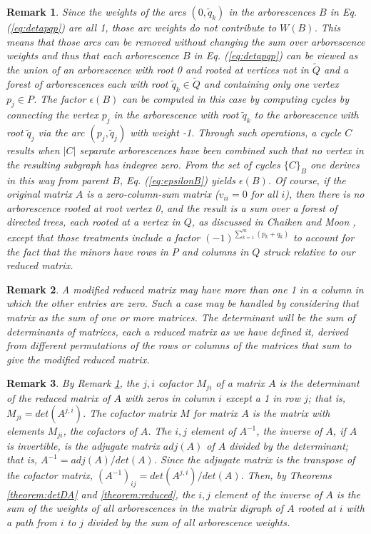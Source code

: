 \documentclass{article}
\newtheorem{remark}{Remark}
\begin{document}
\begin{remark}
Since the weights of the arcs $(0, \tilde{q}_k)$ in the arborescences $B$
in Eq. (\ref{eq:detapqp}) are all 1, those arc weights do not contribute
to $W(B)$.  This means that those arcs can be removed without changing
the sum over arborescence weights and thus that
each arborescence $B$ in Eq. (\ref{eq:detapqp})
can be viewed as the union of an arborescence with root 0
and rooted at vertices not in $\tilde{Q}$ and
a forest of arborescences each with root $\tilde{q}_k \in \tilde{Q}$ and
containing only one vertex $p_j \in P$.  The factor $\epsilon(B)$ can
be computed in this case by computing cycles by connecting the vertex $p_j$
in the arborescence with root $\tilde{q}_k$ to the arborescence with root
$\tilde{q}_j$ via the arc $(p_j, \tilde{q}_j)$ with weight -1.  Through
such operations, a cycle $C$ results when $\vert C \vert$ separate arborescences have
been combined such that no vertex in the resulting subgraph has indegree
zero.  From the set of cycles $\{C\}_B$ one derives in this way from
parent $B$, Eq. (\ref{eq:epsilonB}) yields  $\epsilon(B)$.  Of course, if the original matrix $A$ is a zero-column-sum matrix ($v_{ii} = 0$ for all $i$), then there is no arborescence rooted at root vertex 0, and the result is a sum over a forest of directed trees, each rooted at a vertex in $Q$, as discussed in Chaiken \cite{chaikenSeth} and Moon \cite{MOON1994163}, except that those treatments include a factor $(-1)^{\sum_{k=1}^m (p_k + q_k)}$ to account for the fact that the minors have rows in $P$ and columns in $Q$ struck relative to our reduced matrix.
\label{remark:minor}
\end{remark}

\begin{remark}
A modified reduced matrix may have more than one 1 in a column in which the other entries are zero.  Such a case may be handled by considering that matrix as the sum of one or more matrices.  The determinant will be the sum of determinants of matrices, each a reduced matrix as we have defined it, derived from different permutations of the rows or columns of the matrices that sum to give the modified reduced matrix.
\end{remark}

\begin{remark}
    By Remark \ref{remark:minor}, the $j,i$ cofactor $M_{ji}$ of a matrix $A$ is the determinant of the reduced matrix of $A$ with zeros in column $i$ except a 1 in row $j$; that is, $M_{ji} = det(A^{j,i})$.  The cofactor matrix $M$ for matrix $A$ is the matrix with elements $M_{ji}$, the cofactors of $A$.  The $i,j$ element of $A^{-1}$, the inverse of $A$, if $A$ is invertible, is the adjugate matrix $adj(A)$ of $A$ divided by the determinant; that is, $A^{-1} = adj(A) / det(A)$.  Since the adjugate matrix is the transpose of the cofactor matrix, $(A^{-1})_{ij} = det(A^{j,i})/det(A)$.  Then, by Theorems \ref{theorem:detDA} and \ref{theorem:reduced}, the $i,j$ element of the inverse of $A$ is the sum of the weights of all arborescences in the matrix digraph of $A$ rooted at $i$ with a path from $i$ to $j$ divided by the sum of all arborescence weights.
    \label{remark:inverse}
\end{remark}
\end{document}
